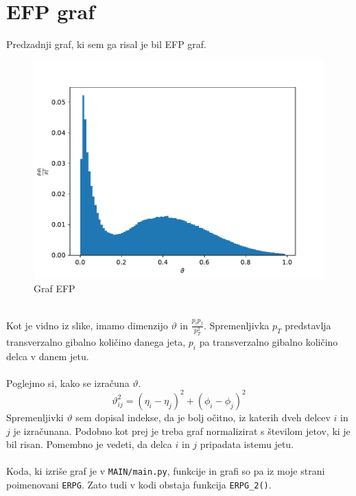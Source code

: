 \section{EFP graf}
Predzadnji graf, ki sem ga risal je bil EFP graf.
\begin{figure}[h]
    \begin{center}
        \includegraphics[width=13cm]{sections/section4/figures/ERPG_2_TTBar.pdf}
        \caption{Graf EFP}
        \label{slika 6}
    \end{center}
\end{figure}
\\
Kot je vidno iz slike, imamo dimenzijo $\vartheta$ in $\frac{p_ip_j}{p_T^2}$.
Spremenljivka $p_T$ predstavlja transverzalno gibalno količino danega jeta, $p_i$ pa
transverzalno gibalno količino delca v danem jetu.
\\
\\
Poglejmo si, kako se izračuna $\vartheta$.
\begin{equation}
    \vartheta_{ij}^2 = \left(\eta_i - \eta_j\right)^2+\left(\phi_i - \phi_j\right)^2
\end{equation}
Spremenljivki $\vartheta$ sem dopisal indekse, da je bolj očitno, iz katerih dveh
delcev $i$ in $j$ je izračunana. Podobno kot prej je treba graf normalizirat s številom
jetov, ki je bil risan. Pomembno je vedeti, da delca $i$ in $j$ pripadata istemu jetu.
\\
\\
Koda, ki izriše graf je v \verb|MAIN/main.py|, funkcije in grafi so pa iz moje strani 
poimenovani \verb|ERPG|. Zato tudi v kodi obstaja funkcija \verb|ERPG_2()|.
